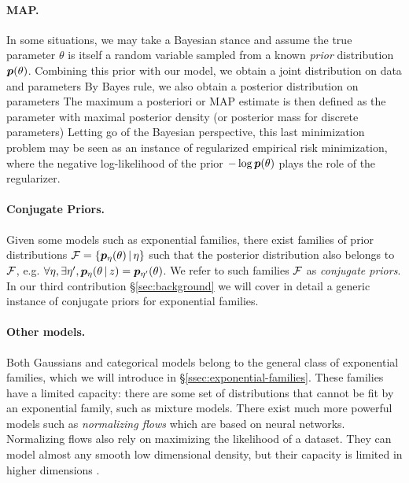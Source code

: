 \paragraph{MAP.}
In some situations, we may take a Bayesian stance and assume the true parameter $\theta$ is itself a random variable sampled from a known \emph{prior} distribution $\bm{p}(\theta)$.
Combining this prior with our model, we obtain a joint distribution on data and parameters
By Bayes rule, we also obtain a posterior distribution on parameters
The maximum a posteriori or MAP estimate is then defined as the parameter with maximal posterior density (or posterior mass for discrete parameters)
Letting go of the Bayesian perspective, this last minimization problem may be seen as an instance of regularized empirical risk minimization, where the negative log-likelihood of the prior $- \log \bm{p}(\theta)$ plays the role of the regularizer.

\paragraph{Conjugate Priors.}
Given some models such as exponential families, there exist families of prior distributions ${\mathcal F} = \{\bm{p}_\eta (\theta) \,\vert\, \eta\}$
such that the posterior distribution also belongs to ${\mathcal F}$,
e.g.  $\forall \eta, \exists \eta', \bm{p}_\eta (\theta \,\vert\, z) = \bm{p}_{\eta'}(\theta)$.
We refer to such families ${\mathcal F}$ as \emph{conjugate priors}.
In our third contribution \S\ref{sec:background} we will cover in detail a generic instance of conjugate priors for exponential families.

\paragraph{Other models.}
Both Gaussians and categorical models belong to the general class of exponential families, which we will introduce in \S\ref{ssec:exponential-families}.
These families have a limited capacity: there are some set of distributions that cannot be fit by an exponential family, such as mixture models.
There exist much more powerful models such as \emph{normalizing flows} \citep{rezende2015variational} which are based on neural networks.
Normalizing flows also rely on maximizing the likelihood of a dataset.
They can model almost any smooth low dimensional density, but their capacity is limited in higher dimensions \citep{kong2020expressive}.


